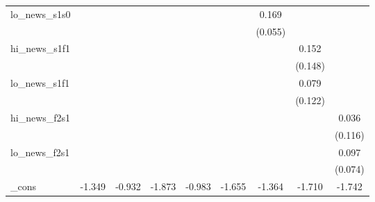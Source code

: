 {\begin{tabular}{l*{8}{c}}
\addlinespace
lo\_news\_s1s0&                     &                     &                     &                     &                     &       0.169\sym{***}&                     &                     \\
            &                     &                     &                     &                     &                     &     (0.055)         &                     &                     \\
\addlinespace
hi\_news\_s1f1&                     &                     &                     &                     &                     &                     &       0.152         &                     \\
            &                     &                     &                     &                     &                     &                     &     (0.148)         &                     \\
\addlinespace
lo\_news\_s1f1&                     &                     &                     &                     &                     &                     &       0.079         &                     \\
            &                     &                     &                     &                     &                     &                     &     (0.122)         &                     \\
\addlinespace
hi\_news\_f2s1&                     &                     &                     &                     &                     &                     &                     &       0.036         \\
            &                     &                     &                     &                     &                     &                     &                     &     (0.116)         \\
\addlinespace
lo\_news\_f2s1&                     &                     &                     &                     &                     &                     &                     &       0.097         \\
            &                     &                     &                     &                     &                     &                     &                     &     (0.074)         \\
\addlinespace
\_cons      &      -1.349\sym{***}&      -0.932\sym{**} &      -1.873\sym{***}&      -0.983\sym{*}  &      -1.655\sym{***}&      -1.364\sym{***}&      -1.710\sym{***}&      -1.742\sym{***}\\

\end{tabular}}
